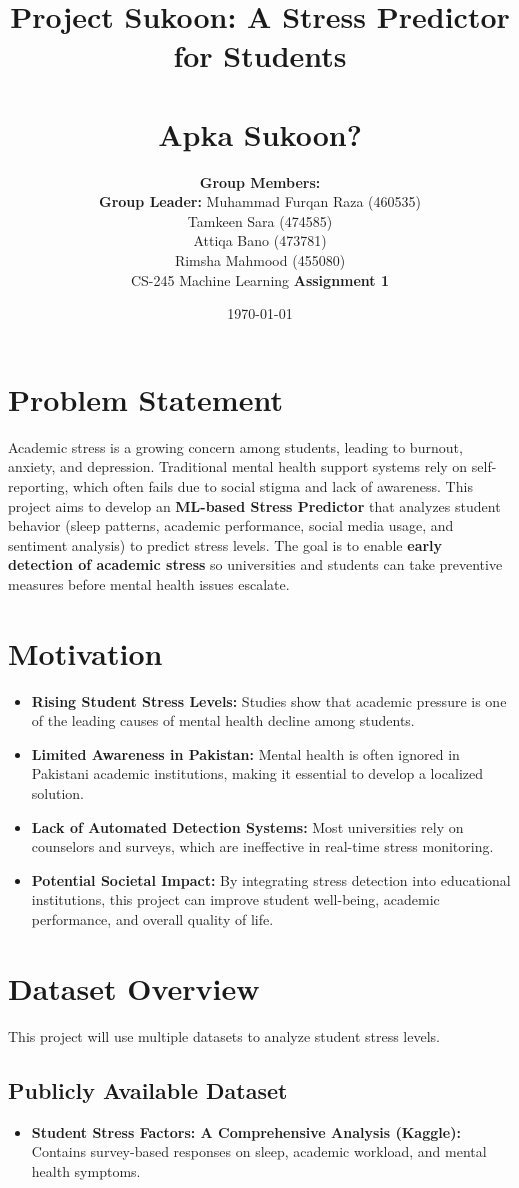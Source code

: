 \documentclass[a4paper,11pt]{article}
\title{\textbf{Project Sukoon: A Stress Predictor for Students} \\ \\[0.3cm] \large \textbf{Apka Sukoon?} }
\author{
    \textbf{Group Members:} \\ 
    \textbf{Group Leader:} Muhammad Furqan Raza (460535)\\ 
    Tamkeen Sara (474585) \\ 
    Attiqa Bano (473781)\\ 
    Rimsha Mahmood (455080)\\ 
    CS-245 Machine Learning
    \textbf{Assignment 1}
}
\date{\today}
\begin{document}
\maketitle

\section{Problem Statement}
Academic stress is a growing concern among students, leading to burnout, anxiety, and depression. Traditional mental health support systems rely on self-reporting, which often fails due to social stigma and lack of awareness. This project aims to develop an \textbf{ML-based Stress Predictor} that analyzes student behavior (sleep patterns, academic performance, social media usage, and sentiment analysis) to predict stress levels. The goal is to enable \textbf{early detection of academic stress} so universities and students can take preventive measures before mental health issues escalate.

\section{Motivation}
\begin{itemize}
    \item \textbf{Rising Student Stress Levels:} Studies show that academic pressure is one of the leading causes of mental health decline among students.
    \item \textbf{Limited Awareness in Pakistan:} Mental health is often ignored in Pakistani academic institutions, making it essential to develop a localized solution.
    \item \textbf{Lack of Automated Detection Systems:} Most universities rely on counselors and surveys, which are ineffective in real-time stress monitoring.
    \item \textbf{Potential Societal Impact:} By integrating stress detection into educational institutions, this project can improve student well-being, academic performance, and overall quality of life.
\end{itemize}

\section{Dataset Overview}
This project will use multiple datasets to analyze student stress levels.

\subsection{Publicly Available Dataset}
\begin{itemize}
    \item \textbf{Student Stress Factors: A Comprehensive Analysis (Kaggle):} Contains survey-based responses on sleep, academic workload, and mental health symptoms.
\end{itemize}
\end{document}
